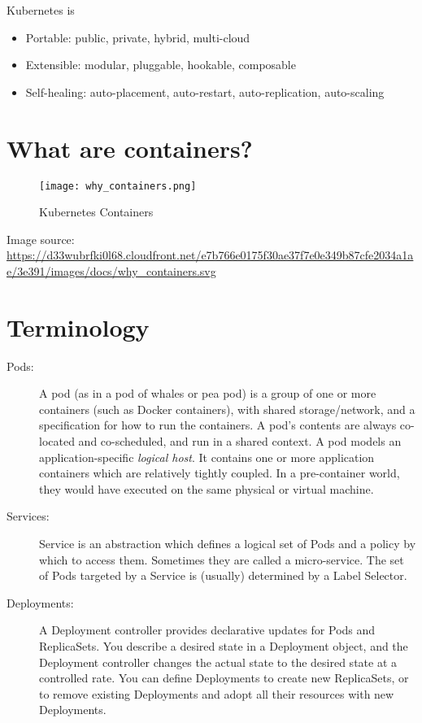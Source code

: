 Kubernetes is

\begin{itemize}

\item Portable: public, private, hybrid, multi-cloud
\item Extensible: modular, pluggable, hookable, composable
\item Self-healing: auto-placement, auto-restart, auto-replication,
  auto-scaling
\end{itemize}

\section{What are containers?}

\begin{figure}[htbp]
\centering
\texttt{[image: why\_containers.png]}
\caption{Kubernetes Containers}
\end{figure}

Image source:
\url{https://d33wubrfki0l68.cloudfront.net/e7b766e0175f30ae37f7e0e349b87cfe2034a1ae/3e391/images/docs/why_containers.svg}

\section{Terminology}

\begin{description}

\item[Pods:] A pod (as in a pod of whales or pea pod) is a
  group of one or more containers (such as Docker containers), with
  shared storage/network, and a specification for how to run the
  containers. A pod's contents are always co-located and co-scheduled,
  and run in a shared context. A pod models an application-specific
  \textit{logical host}. It contains one or more application
  containers which are relatively tightly coupled. In a pre-container
  world, they would have executed on the same physical or virtual
  machine.

\item[Services:] Service is an abstraction
  which defines a logical set of Pods and a policy by which to access
  them. Sometimes they are called a micro-service. The set of Pods
  targeted by a Service is (usually) determined by a Label Selector.

\item[Deployments:] A Deployment
  controller provides declarative updates for Pods and
  ReplicaSets. You describe a desired state in a Deployment object,
  and the Deployment controller changes the actual state to the
  desired state at a controlled rate. You can define Deployments to
  create new ReplicaSets, or to remove existing Deployments and adopt
  all their resources with new Deployments.

\end{description}

